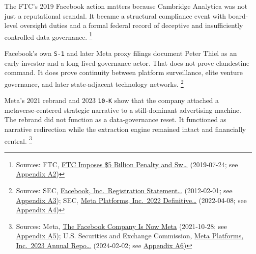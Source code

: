 \documentclass[
  american,
  11pt,
  letterpaper,
]{article}
\begin{document}
The FTC's 2019 Facebook action matters because Cambridge Analytica was
not just a reputational scandal. It became a structural compliance event
with board-level oversight duties and a formal federal record of
deceptive and insufficiently controlled data governance. \footnote{Sources:
  FTC,
  \href{https://www.ftc.gov/news-events/news/press-releases/2019/07/ftc-imposes-5-billion-penalty-sweeping-new-privacy-restrictions-facebook}{FTC
  Imposes \$5 Billion Penalty and Sw\ldots{}} (2019-07-24; see
  \hyperref[ch-01-appendix-a2-ftc-imposes-5-billion-penalty-and-sweeping-new-privacy-restrictions-on-facebook]{Appendix
  A2})}

Facebook's own \texttt{S-1} and later Meta proxy filings document Peter
Thiel as an early investor and a long-lived governance actor. That does
not prove clandestine command. It does prove continuity between platform
surveillance, elite venture governance, and later state-adjacent
technology networks. \footnote{Sources: SEC,
  \href{https://www.sec.gov/Archives/edgar/data/1326801/000119312512034517/d287954ds1.htm}{Facebook,
  Inc.~Registration Statement\ldots{}} (2012-02-01; see
  \hyperref[ch-01-appendix-a3-facebook-inc-registration-statement-on-form-s-1]{Appendix
  A3}); SEC,
  \href{https://www.sec.gov/Archives/edgar/data/1326801/000132680122000043/meta2022definitiveproxysta.htm}{Meta
  Platforms, Inc.~2022 Definitive\ldots{}} (2022-04-08; see
  \hyperref[ch-01-appendix-a4-meta-platforms-inc-2022-definitive-proxy-statement]{Appendix
  A4})}

Meta's 2021 rebrand and 2023 \texttt{10-K} show that the company
attached a metaverse-centered strategic narrative to a still-dominant
advertising machine. The rebrand did not function as a data-governance
reset. It functioned as narrative redirection while the extraction
engine remained intact and financially central. \footnote{Sources: Meta,
  \href{https://about.fb.com/news/2021/10/facebook-company-is-now-meta/}{The
  Facebook Company Is Now Meta} (2021-10-28; see
  \hyperref[ch-01-appendix-a5-the-facebook-company-is-now-meta]{Appendix
  A5}); U.S. Securities and Exchange Commission,
  \href{https://www.sec.gov/Archives/edgar/data/1326801/000132680124000012/meta-20231231.htm}{Meta
  Platforms, Inc.~2023 Annual Repo\ldots{}} (2024-02-02; see
  \hyperref[ch-01-appendix-a6-meta-platforms-inc-2023-annual-report-form-10-k]{Appendix
  A6})}
\end{document}
